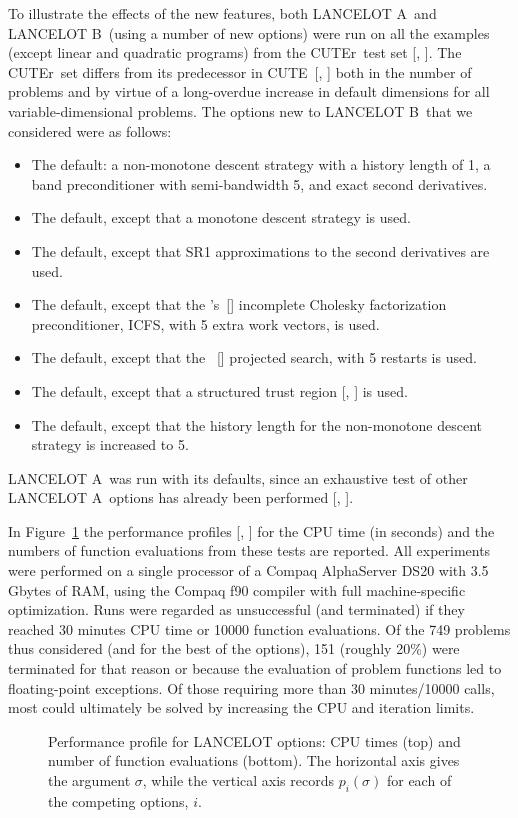 \documentclass[acmtocl,acmnow]{acmtrans2m}
\newcommand{\lana}{{\sf LANCELOT A}}
\newcommand{\lanb}{{\sf LANCELOT B}}
\newcommand{\cute}{{\sf CUTE}}
\newcommand{\cuter}{{\sf CUTEr}}
\newcommand{\citebb}[1]{\citeauthor{#1}\ [\citeyear{#1}]}
\newcommand{\citebbs}[1]{\citeauthor{#1}'s\ [\citeyear{#1}]}
\newcommand{\bciteb}[1]{\citeauthor{#1}, \citeyear{#1}}
\begin{document}
To illustrate the effects of the new features, 
both \lana\ and  \lanb\ (using a number of new options)
were run on all the examples (except linear and quadratic programs) from
the \cuter\ test set [\bciteb{GoulOrbaToin02b}]. The \cuter\ 
set differs from its predecessor
in \cute\ [\bciteb{BongConnGoulToin95}]
both in the number of problems and by virtue of a long-overdue
increase in default dimensions for all variable-dimensional problems.  
The options new to \lanb\ that we considered were as follows:
\begin{itemize}
\item The default: a non-monotone descent strategy with a
history length of 1, a band preconditioner with semi-bandwidth 5, 
and exact second derivatives.
\item The default, except that a monotone descent strategy is used.
\item The default, except that SR1 approximations to the second derivatives
are used.
\item The default, except that the \citebbs{LinMore99} incomplete Cholesky 
   factorization preconditioner, ICFS, with 5 extra work vectors, is used.
\item The default, except that the \citebb{MoreTora91} projected search,
with 5 restarts is used.
\item The default, except that a structured trust region
   [\bciteb{ConnGoulSartToin96a}] is used.
\item The default, except that the history length for the 
non-monotone descent strategy is increased to 5.
\end{itemize}
\lana\ was run with its defaults, since an exhaustive test
of other \lana\ options has already been performed 
[\bciteb{ConnGoulToin96a}].

In Figure~\ref{prof.ps}
the performance profiles [\bciteb{DolaMore01}] for the CPU time
(in seconds) and the numbers of function evaluations  
from these tests are reported. All experiments were performed 
on a single processor of a Compaq AlphaServer DS20 with 3.5 Gbytes of RAM,
using the Compaq f90 compiler with full machine-specific optimization.
Runs were regarded as unsuccessful (and terminated) if they reached 
30 minutes CPU time or 10000 function evaluations.
Of the 749 problems thus considered (and for the best of the 
options), 151 (roughly 20\%) 
were terminated for that reason or because
the evaluation of problem functions led to floating-point exceptions. Of
those requiring more than 30 minutes/10000 calls, most could ultimately 
be solved by increasing the CPU and iteration limits.
\begin{figure}[htbp]
\centerline{
}\centerline{
            }
\caption{Performance profile for LANCELOT options: CPU times (top)
and number of function evaluations (bottom). The horizontal axis
gives the argument $\sigma$, while the vertical axis records $p_i(\sigma)$ 
for each of the competing options, $i$.}
\label{prof.ps}
\end{figure}
\end{document}
